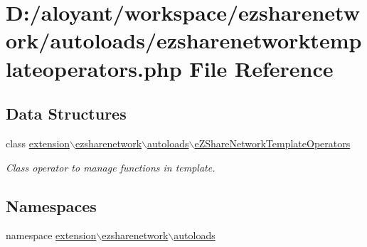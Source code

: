 \hypertarget{ezsharenetworktemplateoperators_8php}{\section{D\-:/aloyant/workspace/ezsharenetwork/autoloads/ezsharenetworktemplateoperators.php File Reference}
\label{ezsharenetworktemplateoperators_8php}
}
\subsection*{Data Structures}
\begin{DoxyCompactItemize}
\item 
class \hyperlink{classextension_1_1ezsharenetwork_1_1autoloads_1_1e_z_share_network_template_operators}{extension$\backslash$ezsharenetwork$\backslash$autoloads$\backslash$e\-Z\-Share\-Network\-Template\-Operators}
\begin{DoxyCompactList}\small\item\em Class operator to manage functions in template. \end{DoxyCompactList}\end{DoxyCompactItemize}
\subsection*{Namespaces}
\begin{DoxyCompactItemize}
\item 
namespace \hyperlink{namespaceextension_1_1ezsharenetwork_1_1autoloads}{extension$\backslash$ezsharenetwork$\backslash$autoloads}
\end{DoxyCompactItemize}
